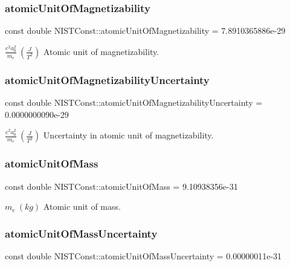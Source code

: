 \subsubsection{\texorpdfstring{atomic\+Unit\+Of\+Magnetizability}{atomicUnitOfMagnetizability}}
{\footnotesize\ttfamily const double N\+I\+S\+T\+Const\+::atomic\+Unit\+Of\+Magnetizability = 7.\+8910365886e-\/29}

$\frac{e^2a_0^2}{m_e} \ (\frac{J}{T^2})$ Atomic unit of magnetizability. \mbox{\label{group___atomic_unit_ga660abcd5b236c672a4f71398bc4894b6}} 
\subsubsection{\texorpdfstring{atomic\+Unit\+Of\+Magnetizability\+Uncertainty}{atomicUnitOfMagnetizabilityUncertainty}}
{\footnotesize\ttfamily const double N\+I\+S\+T\+Const\+::atomic\+Unit\+Of\+Magnetizability\+Uncertainty = 0.\+0000000090e-\/29}

$\frac{e^2a_0^2}{m_e} \ (\frac{J}{T^2})$ Uncertainty in atomic unit of magnetizability. \mbox{\label{group___atomic_unit_ga61a2da51489f7bb8965e9e4747db34a7}} 
\subsubsection{\texorpdfstring{atomic\+Unit\+Of\+Mass}{atomicUnitOfMass}}
{\footnotesize\ttfamily const double N\+I\+S\+T\+Const\+::atomic\+Unit\+Of\+Mass = 9.\+10938356e-\/31}

$m_e \ (kg)$ Atomic unit of mass. \mbox{\label{group___atomic_unit_gaa9459757651cf86d89e722db9911b0e1}} 
\subsubsection{\texorpdfstring{atomic\+Unit\+Of\+Mass\+Uncertainty}{atomicUnitOfMassUncertainty}}
{\footnotesize\ttfamily const double N\+I\+S\+T\+Const\+::atomic\+Unit\+Of\+Mass\+Uncertainty = 0.\+00000011e-\/31}

